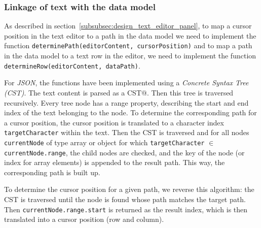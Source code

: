
\subsubsection{Linkage of text with the data model}
As described in section~\ref{subsubsec:design_text_editor_panel}, to map a cursor position in the text editor to
a path in the data model we need to implement the function \texttt{determinePath(editorContent, cursorPosition)}
and to map a path in the data model to a text row in the editor, we need to implement
the function \texttt{determineRow(editorContent, dataPath)}.

For \textit{JSON}, the functions have been implemented using a \textit{Concrete Syntax Tree (CST)}.
The text content is parsed as a CST@.
Then this tree is traversed recursively.
Every tree node has a range property, describing the start and end index of the text belonging to the node.
To determine the corresponding path for a cursor position, the cursor position is translated to a character index
\texttt{targetCharacter} within the text.
Then the CST is traversed and for all nodes \texttt{currentNode} of type array or object for
which \texttt{targetCharacter} $\in$ \texttt{currentNode.range},
the child nodes are checked, and the key of the node (or index for array elements) is appended to the result path.
This way, the corresponding path is built up.

To determine the cursor position for a given path, we reverse this algorithm:
the CST is traversed until the node is found whose path matches the target path.
Then \texttt{currentNode.range.start} is returned as the result index, which is then translated into a cursor position (row and column).

